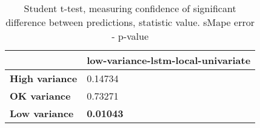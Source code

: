 \begin{table}[H]
\centering
\caption{Student t-test, measuring confidence of significant difference between predictions, statistic value. sMape error - p-value}
\label{table:ttest-p-values-variance-experiments-sMAPE}
\begin{tabular}{ll}
\toprule
{} & low-variance-lstm-local-univariate \\
\midrule
\textbf{High variance} &                            0.14734 \\
\textbf{OK variance  } &                            0.73271 \\
\textbf{Low variance } &                   \textbf{0.01043} \\
\bottomrule
\end{tabular}
\end{table}
